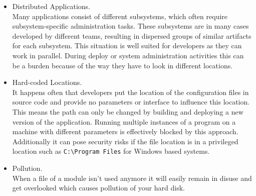 \begin{itemize}
\item Distributed Applications.\\
Many applications consist of different subsystems, which often require  subsystem-specific administration tasks. These subsystems are in many cases developed by different teams, resulting in dispersed groups of similar artifacts for each subsystem. This situation is well suited for developers as they can work in parallel. During deploy or system administration activities this can be a burden because of the way they have to look in different locations.
\item Hard-coded Locations.\\
It happens often that developers put the location of the configuration files in source code and provide no parameters or interface to influence this location. This means the path can only be changed by building and deploying a new version of the application. Running multiple instances of a program on a machine with different parameters is effectively blocked by this approach. Additionally it can pose security risks if the file location is in a privileged location such as \verb|C:\Program Files| for Windows based systems.
\item Pollution.\\
When a file of a module isn't used anymore it will easily remain in disuse and get overlooked which causes pollution of your hard disk.\\
\end{itemize}

\begin{center}
   
\end{center}

